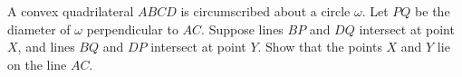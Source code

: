 A convex quadrilateral $ABCD$ is circumscribed about a circle $\omega$. Let $PQ$ be the diameter of $\omega$ perpendicular to $AC$. Suppose lines $BP$ and $DQ$ intersect at point $X$, and lines $BQ$ and $DP$ intersect at point $Y$. Show that the points $X$ and $Y$ lie on the line $AC$.
